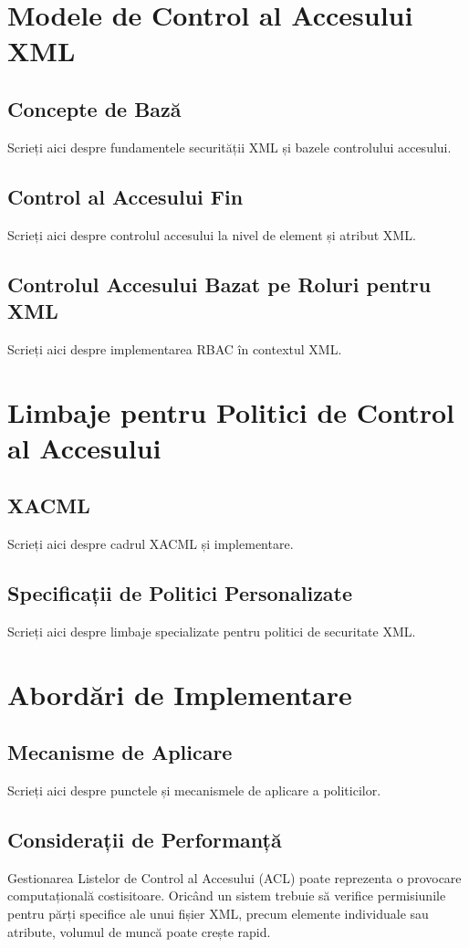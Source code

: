 \documentclass[runningheads]{llncs}
\begin{document}
\begin{spacing}{1.5}
\section{Modele de Control al Accesului XML}

\subsection{Concepte de Bază}
Scrieți aici despre fundamentele securității XML și bazele controlului accesului.

\subsection{Control al Accesului Fin}
Scrieți aici despre controlul accesului la nivel de element și atribut XML.

\subsection{Controlul Accesului Bazat pe Roluri pentru XML}
Scrieți aici despre implementarea RBAC în contextul XML.

\section{Limbaje pentru Politici de Control al Accesului}

\subsection{XACML}
Scrieți aici despre cadrul XACML și implementare.

\subsection{Specificații de Politici Personalizate}
Scrieți aici despre limbaje specializate pentru politici de securitate XML.

\section{Abordări de Implementare}

\subsection{Mecanisme de Aplicare}
Scrieți aici despre punctele și mecanismele de aplicare a politicilor.

\subsection{Considerații de Performanță}
Gestionarea Listelor de Control al Accesului (ACL) poate reprezenta o provocare computațională costisitoare. Oricând un sistem trebuie să verifice permisiunile pentru părți specifice ale unui fișier XML, precum elemente individuale sau atribute, volumul de muncă poate crește rapid.


\end{spacing}
\end{document}
